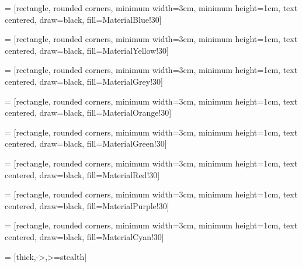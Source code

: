 
\newcommand{\unilogo}{
  \setlength{\TPHorizModule}{1pt}
  \setlength{\TPVertModule}{1pt}
  \begin{textblock}{1}(25,2)
    \texttt{[image: Logomarca2020.png]}
  \end{textblock}
  } 


 = [rectangle, rounded corners, minimum width=3cm, minimum height=1cm, text centered, draw=black, fill=MaterialBlue!30]

 = [rectangle, rounded corners, minimum width=3cm, minimum height=1cm, text centered, draw=black, fill=MaterialYellow!30]

 = [rectangle, rounded corners, minimum width=3cm, minimum height=1cm, text centered, draw=black, fill=MaterialGrey!30]

 = [rectangle, rounded corners, minimum width=3cm, minimum height=1cm, text centered, draw=black, fill=MaterialOrange!30]

 = [rectangle, rounded corners, minimum width=3cm, minimum height=1cm, text centered, draw=black, fill=MaterialGreen!30]

 = [rectangle, rounded corners, minimum width=3cm, minimum height=1cm, text centered, draw=black, fill=MaterialRed!30]

 = [rectangle, rounded corners, minimum width=3cm, minimum height=1cm, text centered, draw=black, fill=MaterialPurple!30]

 = [rectangle, rounded corners, minimum width=3cm, minimum height=1cm, text centered, draw=black, fill=MaterialCyan!30]

 = [thick,->,>=stealth]      